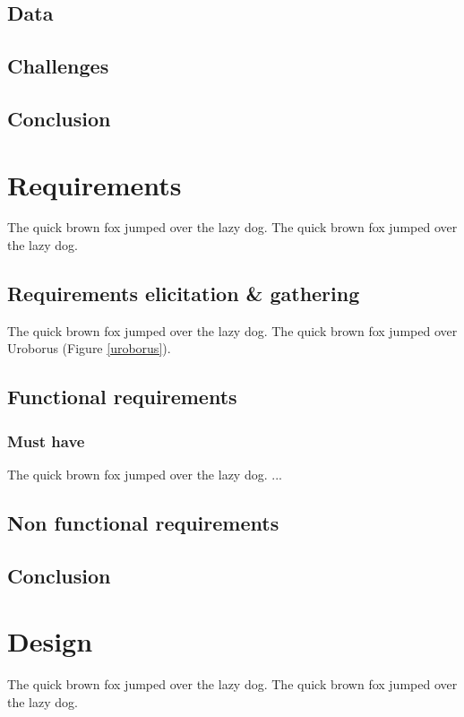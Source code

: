 \documentclass{l4proj}
\begin{document}
\section{Data}

\section{Challenges}

\section{Conclusion}

\chapter{Requirements}
The quick brown fox jumped over the lazy dog.
The quick brown fox jumped over the lazy dog.

\section{Requirements elicitation & gathering}
The quick brown fox jumped over the lazy dog.
The quick brown fox jumped over Uroborus (Figure \ref{uroborus}).

\section{Functional requirements}

\subsection{Must have}
The quick brown fox jumped over the lazy dog.
...

\section{Non functional requirements}

\section{Conclusion}

\chapter{Design}
The quick brown fox jumped over the lazy dog.
The quick brown fox jumped over the lazy dog.
\end{document}
